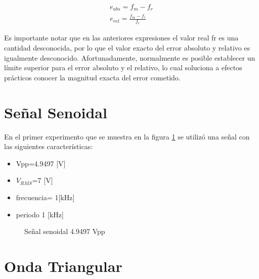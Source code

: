 \documentclass{article}
\begin{document}
\begin{eqnarray}
    e_{abs}= f_m − f_r\\
    e_{rel}= \frac{f_m − f_r}{f_r} 
\end{eqnarray}
    \citep{ErrorEx}

Es importante notar que en las anteriores expresiones el valor real fr es una cantidad desconocida, por lo que el valor exacto del error absoluto y relativo es igualmente desconocido. Afortunadamente, normalmente es posible establecer un límite superior para el error absoluto y el relativo, lo cual soluciona a efectos prácticos conocer la magnitud exacta del error cometido.\citep{ErrorEx}

\section{Señal Senoidal}

En el primer experimento que se muestra en la figura \ref{fig:seno4.9497.1khzprim} se utilizó una señal con las siguientes características:\\

\begin{itemize}
    \item Vpp=4.9497 [V]
    \item $V_{RMS}$=7 [V]
    \item frecuencia= 1[kHz]
    \item periodo 1 [kHz]
\end{itemize}


\begin{figure}[h!]
    \centering
    
   

\caption{Señal senoidal 4.9497 Vpp}
    \label{fig:seno4.9497.1khzprim}
\end{figure}

\section{Onda Triangular}
\end{document}
